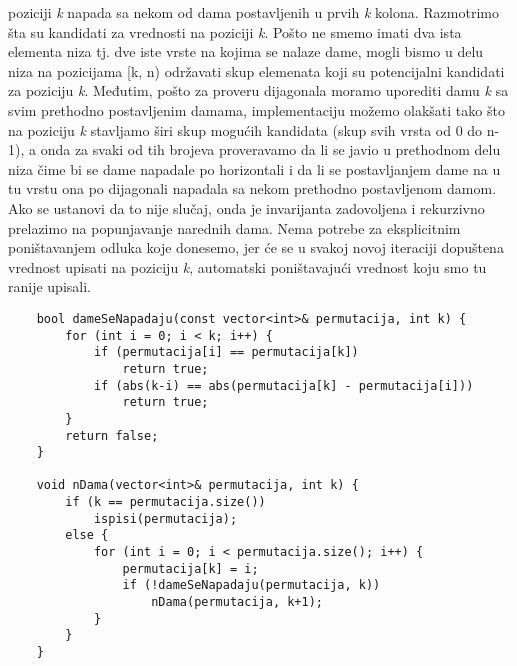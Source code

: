 \documentclass{article}
\begin{document}
poziciji \textit{k} napada sa nekom od dama postavljenih u prvih \textit{k} kolona. Razmotrimo
šta su kandidati za vrednosti na poziciji \textit{k}. Pošto ne smemo imati dva ista
elementa niza tj. dve iste vrste na kojima se nalaze dame, mogli bismo u delu
niza na pozicijama [k, n) održavati skup elemenata koji su potencijalni kandidati
za poziciju \textit{k}. Međutim, pošto za proveru dijagonala moramo uporediti damu \textit{k}
sa svim prethodno postavljenim damama, implementaciju možemo olakšati tako
što na poziciju \textit{k} stavljamo širi skup mogućih kandidata (skup svih vrsta od 0 do n-1), a onda za svaki od tih brojeva proveravamo da li se javio u prethodnom
delu niza čime bi se dame napadale po horizontali i da li se postavljanjem dame na u tu vrstu ona po dijagonali napadala sa nekom prethodno postavljenom
damom. Ako se ustanovi da to nije slučaj, onda je
invarijanta zadovoljena i rekurzivno prelazimo na popunjavanje narednih dama.
Nema potrebe za eksplicitnim poništavanjem odluka koje donesemo, jer će se
u svakoj novoj iteraciji dopuštena vrednost upisati na poziciju \textit{k}, automatski
poništavajući vrednost koju smo tu ranije upisali.
\begin{lstlisting}
    bool dameSeNapadaju(const vector<int>& permutacija, int k) {
        for (int i = 0; i < k; i++) {
            if (permutacija[i] == permutacija[k])
                return true;
            if (abs(k-i) == abs(permutacija[k] - permutacija[i]))
                return true;
        }
        return false;
    }
    
    void nDama(vector<int>& permutacija, int k) {
        if (k == permutacija.size())
            ispisi(permutacija);
        else {
            for (int i = 0; i < permutacija.size(); i++) {
                permutacija[k] = i;
                if (!dameSeNapadaju(permutacija, k))
                    nDama(permutacija, k+1);
            }
        }
    }
\end{lstlisting}
\end{document}
